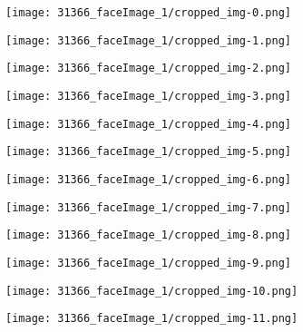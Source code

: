 \begin{figure}
\centering
\parbox{\textwidth}{
\begin{subfigure}{0.09\textwidth}
  \centering
  \texttt{[image: 31366\_faceImage\_1/cropped\_img-0.png]}
\end{subfigure}
\begin{subfigure}{0.09\textwidth}
  \centering
  \texttt{[image: 31366\_faceImage\_1/cropped\_img-1.png]}
\end{subfigure}
\begin{subfigure}{0.09\textwidth}
  \centering
  \texttt{[image: 31366\_faceImage\_1/cropped\_img-2.png]}
\end{subfigure}
\begin{subfigure}{0.09\textwidth}
  \centering
  \texttt{[image: 31366\_faceImage\_1/cropped\_img-3.png]}
\end{subfigure}
\begin{subfigure}{0.09\textwidth}
  \centering
  \texttt{[image: 31366\_faceImage\_1/cropped\_img-4.png]}
\end{subfigure}
\begin{subfigure}{0.09\textwidth}
  \centering
  \texttt{[image: 31366\_faceImage\_1/cropped\_img-5.png]}
\end{subfigure}
\begin{subfigure}{0.09\textwidth}
  \centering
  \texttt{[image: 31366\_faceImage\_1/cropped\_img-6.png]}
\end{subfigure}
\begin{subfigure}{0.09\textwidth}
  \centering
  \texttt{[image: 31366\_faceImage\_1/cropped\_img-7.png]}
\end{subfigure}
\begin{subfigure}{0.09\textwidth}
  \centering
  \texttt{[image: 31366\_faceImage\_1/cropped\_img-8.png]}
\end{subfigure}
\begin{subfigure}{0.09\textwidth}
  \centering
  \texttt{[image: 31366\_faceImage\_1/cropped\_img-9.png]}
\end{subfigure}
}
\parbox{\textwidth}{
\begin{subfigure}{0.09\textwidth}
  \centering
  \texttt{[image: 31366\_faceImage\_1/cropped\_img-10.png]}
\end{subfigure}
\begin{subfigure}{0.09\textwidth}
  \centering
  \texttt{[image: 31366\_faceImage\_1/cropped\_img-11.png]}

\end{subfigure}}
\end{figure}
